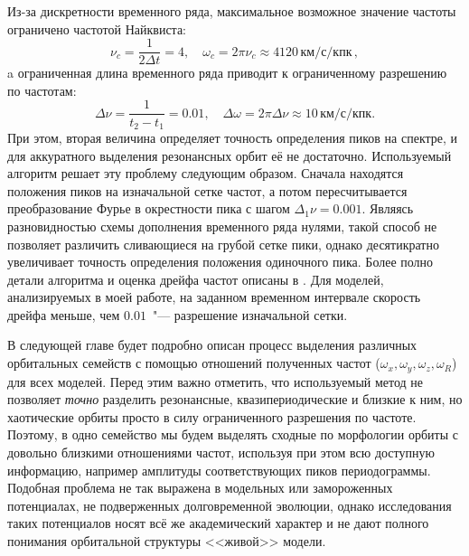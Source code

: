 \documentclass{trlnotes}
\begin{document}
Из-за дискретности временного ряда, максимальное возможное значение частоты ограничено частотой Найквиста: 
\[
  ν_c = \frac{1}{2 Δt} = 4, \quad ω_c = 2\pi ν_c \approx 4120\,\text{км}/\text{с}/\text{кпк}\,,
\]
a ограниченная длина временного ряда приводит к ограниченному разрешению по частотам: 
\[
  Δν = \frac{1}{t_2 - t_1} = 0.01, \quad Δω = 2\pi Δν \approx 10\,\text{км}/\text{с}/\text{кпк}.
\]
При этом, вторая величина определяет точность определения пиков на спектре, и для аккуратного выделения резонансных
орбит её не достаточно.  Используемый алгоритм решает эту проблему следующим образом. Сначала находятся положения пиков
на изначальной сетке частот, а потом пересчитывается преобразование Фурье в окрестности пика с шагом $Δ_1ν = 0.001$.
Являясь разновидностью схемы дополнения временного ряда нулями, такой способ не позволяет различить сливающиеся на
грубой сетке пики, однако десятикратно увеличивает точность определения положения одиночного пика. Более полно детали
алгоритма и оценка дрейфа частот описаны в \citet{parul2020}. Для моделей, анализируемых в моей работе, на заданном
временном интервале скорость дрейфа меньше, чем $0.01$~"--- разрешение изначальной сетки.

В следующей главе будет подробно описан процесс выделения различных орбитальных семейств с помощью отношений полученных
частот ($ω_x, ω_y, ω_z, ω_R$) для всех моделей. Перед этим важно отметить, что используемый метод не позволяет
\emph{точно} разделить резонансные, квазипериодические и близкие к ним, но хаотические орбиты просто в силу
ограниченного разрешения по частоте. Поэтому, в одно семейство мы будем выделять сходные по морфологии орбиты с
довольно близкими отношениями частот, используя при этом всю доступную информацию, например амплитуды соответствующих
пиков периодограммы. Подобная проблема не так выражена в модельных или замороженных потенциалах, не подверженных
долговременной эволюции, однако исследования таких потенциалов носят всё же академический характер и не дают полного
понимания орбитальной структуры <<живой>> модели.
\end{document}

